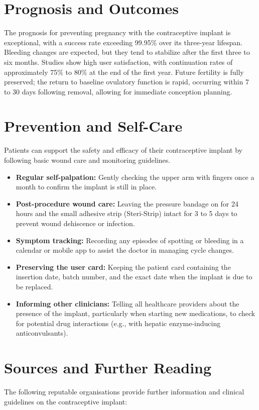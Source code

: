 \section*{Prognosis and Outcomes}
The prognosis for preventing pregnancy with the contraceptive implant is exceptional, with a success rate exceeding 99.95\% over its three-year lifespan. Bleeding changes are expected, but they tend to stabilize after the first three to six months. Studies show high user satisfaction, with continuation rates of approximately 75\% to 80\% at the end of the first year. Future fertility is fully preserved; the return to baseline ovulatory function is rapid, occurring within 7 to 30 days following removal, allowing for immediate conception planning.

\section*{Prevention and Self-Care}
Patients can support the safety and efficacy of their contraceptive implant by following basic wound care and monitoring guidelines.

\begin{itemize}
    \item \textbf{Regular self-palpation:} Gently checking the upper arm with fingers once a month to confirm the implant is still in place.
    \item \textbf{Post-procedure wound care:} Leaving the pressure bandage on for 24 hours and the small adhesive strip (Steri-Strip) intact for 3 to 5 days to prevent wound dehiscence or infection.
    \item \textbf{Symptom tracking:} Recording any episodes of spotting or bleeding in a calendar or mobile app to assist the doctor in managing cycle changes.
    \item \textbf{Preserving the user card:} Keeping the patient card containing the insertion date, batch number, and the exact date when the implant is due to be replaced.
    \item \textbf{Informing other clinicians:} Telling all healthcare providers about the presence of the implant, particularly when starting new medications, to check for potential drug interactions (e.g., with hepatic enzyme-inducing anticonvulsants).
\end{itemize}

\section*{Sources and Further Reading}
The following reputable organisations provide further information and clinical guidelines on the contraceptive implant:

